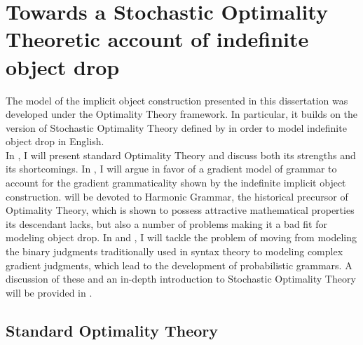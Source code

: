\setchapterpreamble[u]{\margintoc}
\chapter{Towards a Stochastic Optimality Theoretic account of indefinite object drop}



The model of the implicit object construction presented in this dissertation was developed under the Optimality Theory framework. In particular, it builds on the version of Stochastic Optimality Theory defined by \textcite{Medina2007} in order to model indefinite object drop in English.\\
In , I will present standard Optimality Theory and discuss both its strengths and its shortcomings. In , I will argue in favor of a gradient model of grammar to account for the gradient grammaticality shown by the indefinite implicit object construction.  will be devoted to Harmonic Grammar, the historical precursor of Optimality Theory, which is shown to possess attractive mathematical properties its descendant lacks, but also a number of problems making it a bad fit for modeling object drop. In  and , I will tackle the problem of moving from modeling the binary judgments traditionally used in syntax theory to modeling complex gradient judgments, which lead to the development of probabilistic grammars. A discussion of these and an in-depth introduction to Stochastic Optimality Theory will be provided in .

\section{Standard Optimality Theory} 

